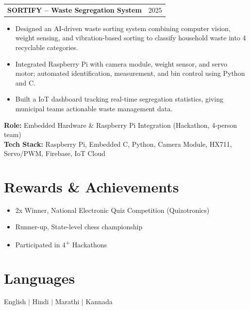 \documentclass[letterpaper,10pt]{article}
\makeatletter
\newcommand{\resumeItemListStart}{\begin{itemize}[leftmargin=0.18in, topsep=1.5pt, parsep=0pt, itemsep=1pt]}
\newcommand{\resumeItemListEnd}{\end{itemize}\vspace{-4pt}}
\newcommand{\resumeItem}[1]{\item\small{#1}}
\newcommand{\resumeProjectHeading}[2]{
  \vspace{-1pt}
  \begin{tabular*}{\textwidth}[t]{l@{\extracolsep{\fill}}r}
    \textbf{#1} & #2 \\
  \end{tabular*}\vspace{-4pt}
}
\makeatother
\begin{document}
\vspace{3pt}

\resumeProjectHeading
  {\textbf{SORTIFY -- Waste Segregation System}}{2025}
\resumeItemListStart
  \resumeItem{Designed an AI-driven waste sorting system combining computer vision, weight sensing, and vibration-based sorting to classify household waste into 4 recyclable categories.}
  \resumeItem{Integrated Raspberry Pi with camera module, weight sensor, and servo motor; automated identification, measurement, and bin control using Python and C.}
  \resumeItem{Built a IoT dashboard tracking real-time segregation statistics, giving municipal teams actionable waste management data.}
\resumeItemListEnd
\small{\textbf{Role:} Embedded Hardware \& Raspberry Pi Integration (Hackathon, 4-person team)} \\
\small{\textbf{Tech Stack:} Raspberry Pi, Embedded C, Python, Camera Module, HX711, Servo/PWM, Firebase, IoT Cloud}

\vspace{-2pt}

\section{Rewards \& Achievements}
\resumeItemListStart
  \resumeItem{2x Winner, National Electronic Quiz Competition (Quizotronics)}
  \resumeItem{Runner-up, State-level chess championship}
  \resumeItem{Participated in 4\textsuperscript{+} Hackathons}
\resumeItemListEnd

\vspace{-4pt}

\section{Languages}
\small
English \enspace $|$ \enspace Hindi \enspace $|$ \enspace Marathi \enspace $|$ \enspace Kannada
\end{document}
